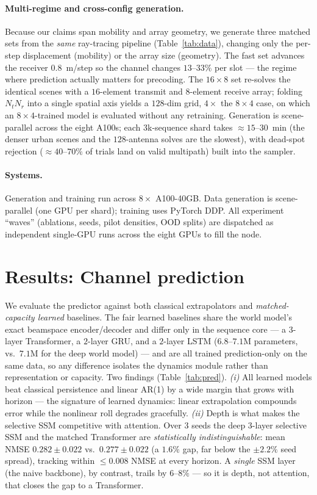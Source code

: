 \documentclass[11pt]{article}
\begin{document}
\paragraph{Multi-regime and cross-config generation.} Because our claims span mobility and array
geometry, we generate three matched sets from the \emph{same} ray-tracing pipeline (Table~\ref{tab:data}),
changing only the per-step displacement (mobility) or the array size (geometry). The fast set advances
the receiver $0.8$~m/step so the channel changes $13$--$33\%$ per slot --- the regime where prediction
actually matters for precoding. The $16\times8$ set re-solves the identical scenes with a $16$-element
transmit and $8$-element receive array; folding $N_tN_r$ into a single spatial axis yields a $128$-dim
grid, $4\times$ the $8\times4$ case, on which an $8\times4$-trained model is evaluated without any
retraining. Generation is scene-parallel across the eight A100s; each $3$k-sequence shard takes
$\approx\!15$--$30$~min (the denser urban scenes and the $128$-antenna solves are the slowest), with
dead-spot rejection ($\approx\!40$--$70\%$ of trials land on valid multipath) built into the sampler.

\paragraph{Systems.} Generation and training run across $8\times$ A100-40GB. Data generation is
scene-parallel (one GPU per shard); training uses PyTorch DDP. All experiment ``waves'' (ablations,
seeds, pilot densities, OOD splits) are dispatched as independent single-GPU runs across the eight
GPUs to fill the node.

\section{Results: Channel prediction}\label{sec:res-pred}

We evaluate the predictor against both classical extrapolators and \emph{matched-capacity learned}
baselines. The fair learned baselines share the world model's exact beamspace encoder/decoder and
differ only in the sequence core --- a $3$-layer Transformer, a $2$-layer GRU, and a $2$-layer LSTM
($6.8$--$7.1$M parameters, vs.\ $7.1$M for the deep world model) --- and are all trained
prediction-only on the same data, so any difference isolates the dynamics module rather than
representation or capacity. Two findings (Table~\ref{tab:pred}). \emph{(i)} All learned models beat
classical persistence and linear AR(1) by a wide margin that grows with horizon --- the signature of
learned dynamics: linear extrapolation compounds error while the nonlinear roll degrades gracefully.
\emph{(ii)} Depth is what makes the selective SSM competitive with attention. Over $3$ seeds the deep
$3$-layer selective SSM and the matched Transformer are \emph{statistically indistinguishable}: mean
NMSE $0.282\!\pm\!0.022$ vs.\ $0.277\!\pm\!0.022$ (a $1.6\%$ gap, far below the $\pm2.2\%$ seed spread),
tracking within $\le\!0.008$ NMSE at every horizon. A \emph{single} SSM layer (the naive backbone), by
contrast, trails by $6$--$8\%$ --- so it is depth, not attention, that closes the gap to a Transformer.
\end{document}
